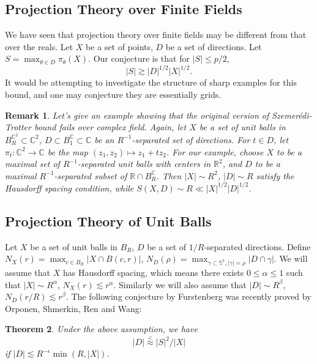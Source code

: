 \documentclass[12pt]{amsart}
\newtheorem{theorem}{Theorem}[section]
\newtheorem{remark}[theorem]{Remark}
\begin{document}
\subsection*{Projection Theory over Finite Fields}

We have seen that projection theory over finite fields may be different from that over the reals. Let $X$ be a set of points, $D$ be a set of directions. Let $S = \max_{\theta \in D} \pi_\theta(X)$. Our conjecture is that for $|S| \le p/2$, 
\begin{equation*}
    |S| \gtrsim |D|^{1/2} |X|^{1/2}.
\end{equation*}
It would be attempting to investigate the structure of sharp examples for this bound, and one may conjecture they are essentially grids. 

\begin{remark}
    Let's give an example showing that the original version of Szemer\'edi-Trotter bound fails over complex field. Again, let $X$ be a set of unit balls in $B_R^{\mathbb{C}^2} \subset \mathbb{C}^2$, $D \subset B_1^\mathbb{C} \subset  \mathbb{C}$ be an $R^{-1}$-separated set of directions. For $t \in D$, let $\pi_t: \mathbb{C}^2 \to \mathbb{C}$ be the map $(z_1, z_2) \mapsto z_1 + t z_2$. For our example, choose $X$ to be a maximal set of $R^{-1}$-separated unit balls with centers in $\mathbb{R}^2$, and $D$ to be a maximal $R^{-1}$-separated subset of $\mathbb{R} \cap B_R^\mathbb{C}$. Then $|X| \sim R^2$, $|D| \sim R$ satisfy the Hausdorff spacing condition, while $S(X,D) \sim R \ll |X|^{1/2} |D|^{1/2}$.
\end{remark}

\subsection*{Projection Theory of Unit Balls}

Let $X$ be a set of unit balls in $B_R$, $D$ be a set of $1/R$-separated directions. Define $N_X(r) = \max_{c \in B_R} |X \cap B(c,r)|$, $N_D(\rho) = \max_{\gamma \subset \mathbb{S}^1, |\gamma| = \rho} |D \cap \gamma|$. We will assume that $X$ has Hausdorff spacing, which means there exists $0 \le \alpha \le 1$ such that $|X| \sim R^\alpha$, $N_X(r) \lesssim r^\alpha$. Similarly we will also assume that $|D| \sim R^\beta$, $N_D(r/R) \lesssim r^\beta$. The following conjecture by Furstenberg was recently proved by Orponen, Shmerkin, Ren and Wang:

\begin{theorem}
    Under the above assumption, we have 
    \begin{equation*}
        |D| \stackrel{<}{\approx} |S|^2/|X|
    \end{equation*}
    if $|D| \lesssim R^{-\epsilon}\min(R,|X|)$.
\end{theorem}
\end{document}
